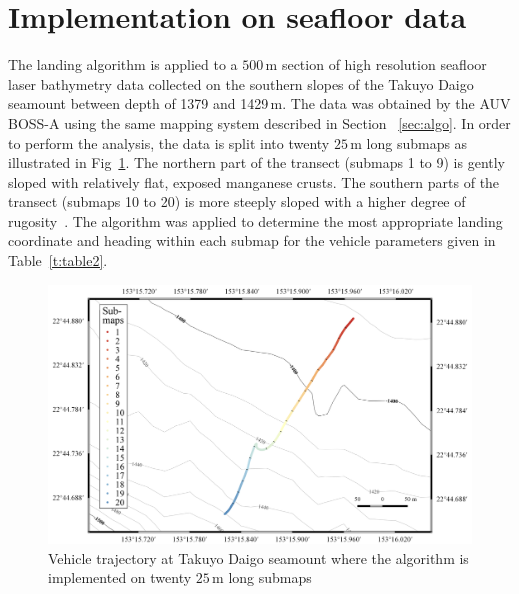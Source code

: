 \section{Implementation on seafloor data}

The landing algorithm is applied to a $500$\,m section of high resolution seafloor laser bathymetry data collected on the southern slopes of the Takuyo Daigo seamount between depth of 1379 and 1429\,m. The data was obtained by the AUV BOSS-A using the same mapping system described in Section ~\ref{sec:algo}. In order to perform the analysis, the data is split into twenty $25$\,m long submaps as illustrated in Fig~\ref{f:mehul24}. The northern part of the transect (submaps 1 to 9) is gently sloped with relatively flat, exposed manganese crusts. The  southern parts of the transect (submaps 10 to 20) is more steeply sloped with a higher degree of rugosity~\cite{Thornton2013l,Bodenmann2016}. The algorithm was applied to determine the most appropriate landing coordinate and heading within each submap for the vehicle parameters given in Table~\ref{t:table2}. 

	
\begin{figure}[!ht]
\centering
\includegraphics[width=6.5in]{./images/mehul24_BT.png}
\caption{Vehicle trajectory at Takuyo Daigo seamount where the algorithm is implemented on twenty $25$\,m long submaps}
\label{f:mehul24}
\end{figure}

